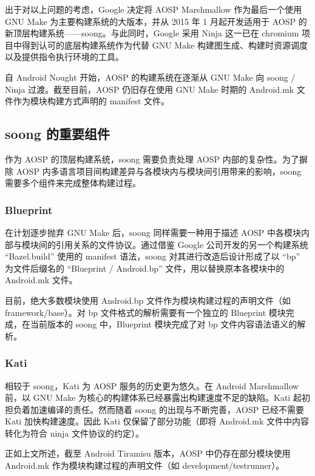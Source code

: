 出于对以上问题的考虑，Google 决定将 AOSP Marshmallow 作为最后一个使用 GNU Make 为主要构建系统的大版本，并从 2015 年 1 月起开发适用于 AOSP 的新顶层构建系统——soong。与此同时，Google 采用 Ninja 这一已在 chromium 项目中得到认可的底层构建系统作为代替 GNU Make 构建图生成、构建时资源调度以及提供指令执行环境的工具。

自 Android Nought 开始，AOSP 的构建系统在逐渐从 GNU Make 向 soong / Ninja 过渡。截至目前，AOSP 仍旧存在使用 GNU Make 时期的 Android.mk 文件作为模块构建方式声明的 manifest 文件。

\subsection{soong 的重要组件}

作为 AOSP 的顶层构建系统，soong 需要负责处理 AOSP 内部的复杂性。为了摒除 AOSP 内多语言项目间构建差异与各模块内与模块间引用带来的影响，soong 需要多个组件来完成整体构建过程。

\subsubsection{Blueprint}

在计划逐步抛弃 GNU Make 后，soong 同样需要一种用于描述 AOSP 中各模块内部与模块间的引用关系的文件协议。通过借鉴 Google 公司开发的另一个构建系统 “Bazel.build” 使用的 manifest 语法，soong 对其进行改造后设计形成了以 “bp” 为文件后缀名的 “Blueprint / Android.bp” 文件，用以替换原本各模块中的 Android.mk 文件。 

目前，绝大多数模块使用 Android.bp 文件作为模块构建过程的声明文件（如 framework/base）。对 bp 文件格式的解析需要有一个独立的 Blueprint 模块完成，在当前版本的 soong 中，Blueprint 模块完成了对 bp 文件内容语法语义的解析。

\subsubsection{Kati}

相较于 soong，Kati 为 AOSP 服务的历史更为悠久。在 Android Marshmallow 前，以 GNU Make 为核心的构建体系已经暴露出构建速度不足的缺陷。Kati 起初担负着加速编译的责任。然而随着 soong 的出现与不断完善，AOSP 已经不需要 Kati 加快构建速度。因此 Kati 仅保留了部分功能（即将 Android.mk 文件中内容转化为符合 ninja 文件协议的约定）。

正如上文所述，截至 Android Tiramisu 版本，AOSP 中仍存在部分模块使用 Android.mk 作为模块构建过程的声明文件（如 development/testrunner）。

